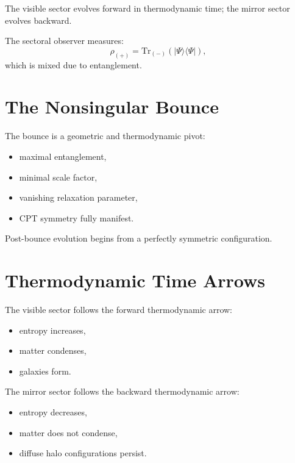 \documentclass[11pt,a4paper]{article}
\begin{document}
The visible sector evolves forward in thermodynamic time; the mirror sector
evolves backward.

The sectoral observer measures:
\begin{equation}
\rho_{(+)}
=
\mathrm{Tr}_{(-)}(|\Psi\rangle\langle\Psi|),
\end{equation}
which is mixed due to entanglement.

\section{The Nonsingular Bounce}

The bounce is a geometric and thermodynamic pivot:
\begin{itemize}[leftmargin=0.8cm]
  \item maximal entanglement,
  \item minimal scale factor,
  \item vanishing relaxation parameter,
  \item CPT symmetry fully manifest.
\end{itemize}

Post-bounce evolution begins from a perfectly symmetric configuration.

\section{Thermodynamic Time Arrows}

The visible sector follows the forward thermodynamic arrow:
\begin{itemize}[leftmargin=0.8cm]
  \item entropy increases,
  \item matter condenses,
  \item galaxies form.
\end{itemize}

The mirror sector follows the backward thermodynamic arrow:
\begin{itemize}[leftmargin=0.8cm]
  \item entropy decreases,
  \item matter does not condense,
  \item diffuse halo configurations persist.
\end{itemize}
\end{document}
